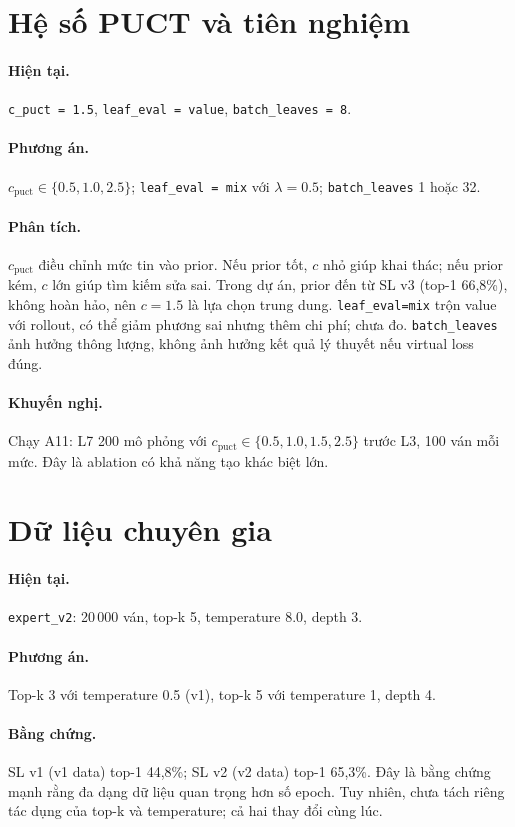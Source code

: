 \section{Hệ số PUCT và tiên nghiệm}
\paragraph{Hiện tại.} \texttt{c\_puct = 1.5}, \texttt{leaf\_eval = value}, \texttt{batch\_leaves = 8}.
\paragraph{Phương án.} $c_{\text{puct}} \in \{0.5, 1.0, 2.5\}$; \texttt{leaf\_eval = mix} với
$\lambda=0.5$; \texttt{batch\_leaves} 1 hoặc 32.
\paragraph{Phân tích.} $c_{\text{puct}}$ điều chỉnh mức tin vào prior. Nếu prior tốt, $c$ nhỏ
giúp khai thác; nếu prior kém, $c$ lớn giúp tìm kiếm sửa sai. Trong dự án, prior đến từ SL v3
(top-1 66,8\%), không hoàn hảo, nên $c=1.5$ là lựa chọn trung dung. \texttt{leaf\_eval=mix}
trộn value với rollout, có thể giảm phương sai nhưng thêm chi phí; chưa đo. \texttt{batch\_leaves}
ảnh hưởng thông lượng, không ảnh hưởng kết quả lý thuyết nếu virtual loss đúng.
\paragraph{Khuyến nghị.} Chạy A11: L7 200 mô phỏng với $c_{\text{puct}} \in \{0.5,1.0,1.5,2.5\}$
trước L3, 100 ván mỗi mức. Đây là ablation có khả năng tạo khác biệt lớn.

\section{Dữ liệu chuyên gia}
\paragraph{Hiện tại.} \texttt{expert\_v2}: 20\,000 ván, top-k 5, temperature 8.0, depth 3.
\paragraph{Phương án.} Top-k 3 với temperature 0.5 (v1), top-k 5 với temperature 1, depth 4.
\paragraph{Bằng chứng.} SL v1 (v1 data) top-1 44,8\%; SL v2 (v2 data) top-1 65,3\%. Đây là bằng
chứng mạnh rằng đa dạng dữ liệu quan trọng hơn số epoch. Tuy nhiên, chưa tách riêng tác dụng
của top-k và temperature; cả hai thay đổi cùng lúc.
